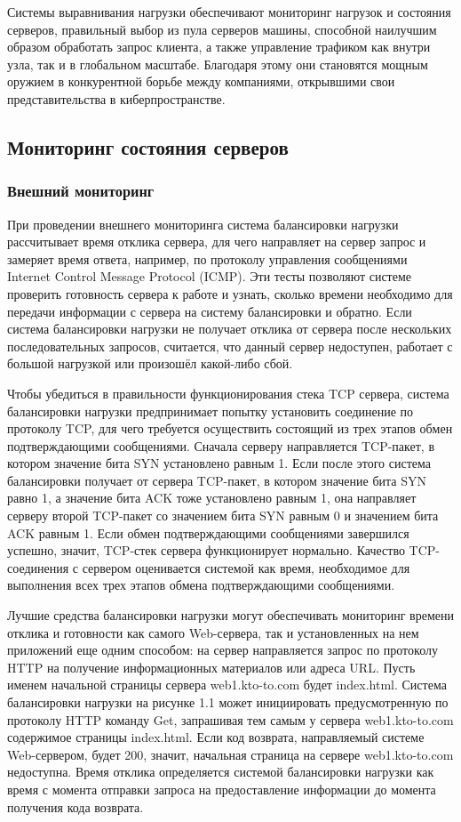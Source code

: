 Системы выравнивания нагрузки обеспечивают мониторинг нагрузок и состояния серверов, правильный выбор из пула серверов машины, способной наилучшим образом обработать запрос клиента, а также управление трафиком как внутри узла, так и в глобальном масштабе. Благодаря этому они становятся мощным оружием в конкурентной борьбе между компаниями, открывшими свои представительства в киберпространстве.

\subsection{Мониторинг состояния серверов}

\subsubsection{Внешний мониторинг}

При проведении внешнего мониторинга система балансировки нагрузки рассчитывает время отклика сервера, для чего направляет на сервер запрос и замеряет время ответа, например, по протоколу управления сообщениями Internet Control Message Protocol (ICMP).  Эти тесты позволяют системе проверить  готовность сервера к работе и узнать, сколько времени необходимо для передачи информации с сервера на систему балансировки и обратно. Если система балансировки нагрузки не получает отклика от сервера после нескольких последовательных запросов, считается, что данный сервер недоступен, работает с большой нагрузкой или произошёл какой-либо сбой.

Чтобы убедиться в правильности функционирования стека TCP сервера, система балансировки нагрузки предпринимает попытку установить соединение по протоколу TCP, для чего требуется осуществить состоящий из трех этапов обмен подтверждающими сообщениями. Сначала серверу направляется TCP-пакет, в котором значение бита SYN установлено равным 1. Если после этого система балансировки получает от сервера TCP-пакет, в котором значение бита SYN равно 1, а значение бита ACK тоже установлено равным 1, она направляет серверу второй TCP-пакет со значением бита SYN равным 0 и значением бита ACK равным 1. Если обмен подтверждающими сообщениями завершился успешно, значит, TCP-стек сервера функционирует нормально. Качество TCP-соединения с сервером оценивается системой как время, необходимое для выполнения всех трех этапов обмена подтверждающими сообщениями.

Лучшие средства балансировки нагрузки могут обеспечивать мониторинг времени отклика и готовности как самого Web-сервера, так и установленных на нем приложений еще одним способом: на сервер направляется запрос по протоколу HTTP на получение информационных материалов или адреса URL. Пусть именем начальной страницы сервера web1.kto-to.com будет index.html. Система балансировки нагрузки на рисунке 1.1 может инициировать предусмотренную по протоколу HTTP команду Get, запрашивая тем самым у сервера web1.kto-to.com содержимое страницы index.html. Если код возврата, направляемый системе Web-сервером, будет 200, значит, начальная страница на сервере web1.kto-to.com недоступна. Время отклика определяется системой балансировки нагрузки как время с момента отправки запроса на предоставление информации до момента получения кода возврата.

